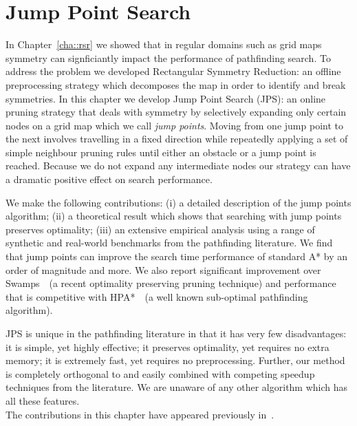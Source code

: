 \chapter{Jump Point Search}
\label{cha::jps}
In Chapter~\ref{cha::rsr} we showed that in regular domains such as grid maps
symmetry can signficiantly impact the performance of pathfinding search.
 To address the problem we developed Rectangular Symmetry Reduction:
 an offline preprocessing strategy which decomposes the map in order to 
identify and break symmetries.
 In this chapter we develop Jump Point Search 
(JPS): an online pruning strategy that
deals with symmetry by selectively expanding only certain nodes on a grid map
which we call \emph{jump points}.  
Moving from one jump point to the next
involves travelling in a fixed direction while repeatedly applying a set of
simple neighbour pruning rules until either an obstacle or a jump point is
reached.  Because we do not expand any intermediate nodes %
our strategy can have a dramatic positive effect on search performance.
\par
We make the following contributions: (i) a detailed description of the jump
points algorithm; (ii) a theoretical result which shows that searching with jump
points preserves optimality;  (iii) an extensive empirical analysis using
a range of synthetic and real-world benchmarks from the pathfinding literature.
We find that jump points can improve the search time performance of standard A* by
an order of magnitude and more.  We also report significant improvement over
Swamps~\citep{pochter10}~(a recent optimality preserving pruning technique) and
performance that is competitive with HPA*~\citep{botea04}~(a well known 
sub-optimal pathfinding algorithm).
\par
JPS is unique in the pathfinding literature in that it has very few
disadvantages: it is simple, yet highly effective; it preserves optimality, yet
requires no extra memory;  it is extremely fast, yet requires no preprocessing.
Further, our method is completely orthogonal to and easily combined with 
competing speedup techniques from the literature.
We are unaware of any other algorithm which has all these features.
\\ \newline 
The contributions in this chapter have appeared previously in~\citep{harabor11b,harabor12}.
\newpage
